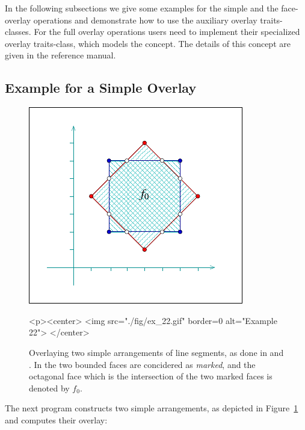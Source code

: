 In the following subsections we give some examples for the simple and the
face-overlay operations and demonstrate how to use the auxiliary overlay
traits-classes. For the full overlay operations users need to implement
their specialized overlay traits-class, which models the 
concept. The details of this concept are given in the reference manual.

\subsection{Example for a Simple Overlay}
\label{arr_ssec:simp_ovl}
%
\begin{figure}[!htp]
\begin{ccTexOnly}
  \begin{center}
  \includegraphics{Arrangement_2/fig/ex_22}
  \end{center}
\end{ccTexOnly}
\begin{ccHtmlOnly}
  <p><center>
  <img src="./fig/ex_22.gif" border=0 alt="Example 22">
  </center>
\end{ccHtmlOnly}
\caption{Overlaying two simple arrangements of line segments, as done
in  and .
In  the two bounded faces are
concidered as {\em marked}, and the octagonal face which is the intersection
of the two marked faces is denoted by $f_0$.}
\label{arr_fig:ex_22}
\end{figure}

The next program constructs two simple arrangements, as depicted in
Figure~\ref{arr_fig:ex_22} and computes their overlay:


